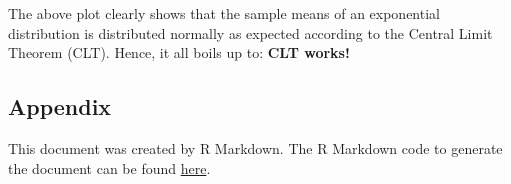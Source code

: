 \documentclass[]{article}
\begin{document}
The above plot clearly shows that the sample means of an exponential
distribution is distributed normally as expected according to the
Central Limit Theorem (CLT). Hence, it all boils up to: \textbf{CLT
works!}

\hypertarget{appendix}{%
\subsection{Appendix}\label{appendix}}

This document was created by R Markdown. The R Markdown code to generate
the document can be found
\href{https://github.com/pourkhesalian/statistical-inference-course-project}{here}.
\end{document}
